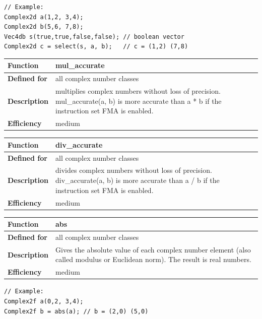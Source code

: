 \documentclass[11pt,a4paper,oneside,openright]{report}
\newcommand{\vspacesmall}{\vspace{3mm}}
\newcommand{\vspacebig}{\vspace{6mm}}
\begin{document}
\begin{lstlisting}[frame=none]
// Example:
Complex2d a(1,2, 3,4);
Complex2d b(5,6, 7,8);
Vec4db s(true,true,false,false); // boolean vector
Complex2d c = select(s, a, b);   // c = (1,2) (7,8)
\end{lstlisting}
\vspacebig

\begin{tabular}{|p{25mm}|p{100mm}|}
\hline
\bfseries Function & mul\_accurate \\ \hline
\bfseries Defined for & all complex number classes  \\ \hline
\bfseries Description & multiplies complex numbers without loss of precision.  \newline
mul\_accurate(a, b) is more accurate than a * b if the instruction set FMA is enabled.\\ \hline
\bfseries Efficiency & medium \\ \hline
\end{tabular}
\vspacebig


\begin{tabular}{|p{25mm}|p{100mm}|}
\hline
\bfseries Function & div\_accurate \\ \hline
\bfseries Defined for & all complex number classes  \\ \hline
\bfseries Description & divides complex numbers without loss of precision. \newline
div\_accurate(a, b) is more accurate than a / b if the instruction set FMA is enabled.\\ \hline
\bfseries Efficiency & medium \\ \hline
\end{tabular}
\vspacebig


\begin{tabular}{|p{25mm}|p{100mm}|}
\hline
\bfseries Function & abs \\ \hline
\bfseries Defined for & all complex number classes  \\ \hline
\bfseries Description & Gives the absolute value of each complex number element (also called modulus or Euclidean norm). \newline
The result is real numbers. \\ \hline
\bfseries Efficiency & medium \\ \hline
\end{tabular}
\vspacesmall

\begin{lstlisting}[frame=none]
// Example:
Complex2f a(0,2, 3,4);
Complex2f b = abs(a); // b = (2,0) (5,0)
\end{lstlisting}
\vspacebig
\end{document}
